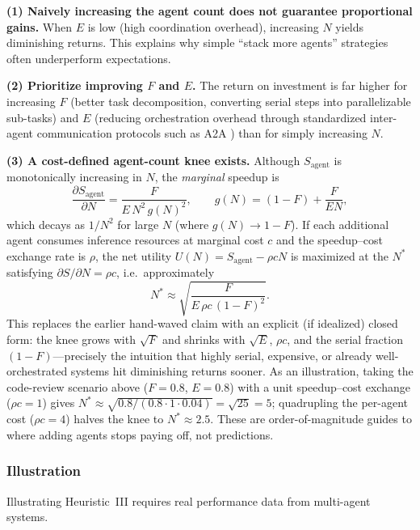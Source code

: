 \textbf{(1) Naively increasing the agent count does not guarantee proportional gains.} When $E$ is low (high coordination overhead), increasing $N$ yields diminishing returns. This explains why simple ``stack more agents'' strategies often underperform expectations.

\textbf{(2) Prioritize improving $F$ and $E$.} The return on investment is far higher for increasing $F$ (better task decomposition, converting serial steps into parallelizable sub-tasks) and $E$ (reducing orchestration overhead through standardized inter-agent communication protocols such as A2A \cite{agentprotocols2025}) than for simply increasing $N$.

\textbf{(3) A cost-defined agent-count knee exists.} Although $S_{\mathrm{agent}}$ is monotonically increasing in $N$, the \emph{marginal} speedup is
\begin{equation}
\frac{\partial S_{\mathrm{agent}}}{\partial N} = \frac{F}{E\,N^{2}\,g(N)^{2}}, \qquad g(N) = (1-F) + \frac{F}{EN},
\end{equation}
which decays as $1/N^{2}$ for large $N$ (where $g(N)\to 1-F$). If each additional agent consumes inference resources at marginal cost $c$ and the speedup--cost exchange rate is $\rho$, the net utility $U(N) = S_{\mathrm{agent}} - \rho c N$ is maximized at the $N^{*}$ satisfying $\partial S/\partial N = \rho c$, i.e.\ approximately
\begin{equation}
N^{*} \approx \sqrt{\frac{F}{E\,\rho c\,(1-F)^{2}}}.
\end{equation}
This replaces the earlier hand-waved claim with an explicit (if idealized) closed form: the knee grows with $\sqrt{F}$ and shrinks with $\sqrt{E}$, $\rho c$, and the serial fraction $(1-F)$---precisely the intuition that highly serial, expensive, or already well-orchestrated systems hit diminishing returns sooner. As an illustration, taking the code-review scenario above ($F=0.8$, $E=0.8$) with a unit speedup--cost exchange ($\rho c = 1$) gives $N^{*} \approx \sqrt{0.8/(0.8 \cdot 1 \cdot 0.04)} = \sqrt{25} = 5$; quadrupling the per-agent cost ($\rho c = 4$) halves the knee to $N^{*} \approx 2.5$. These are order-of-magnitude guides to where adding agents stops paying off, not predictions.

\subsubsection{Illustration}

Illustrating Heuristic~III requires real performance data from multi-agent systems.

